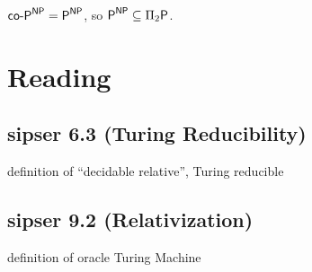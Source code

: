 \documentclass{article}
\begin{document}
\begin{corollary}
  \(\text{\sf co-}\text{\sf P}^\text{\sf NP} = \text{\sf P}^\text{\sf NP}\), so \(\text{\sf P}^\text{\sf NP} \subseteq \Pi_2\text{\sf P}\).
\end{corollary}

\section{Reading}

\subsection{sipser 6.3 (Turing Reducibility)}

definition of ``decidable relative'', Turing reducible

\subsection{sipser 9.2 (Relativization)}

definition of oracle Turing Machine
\end{document}
